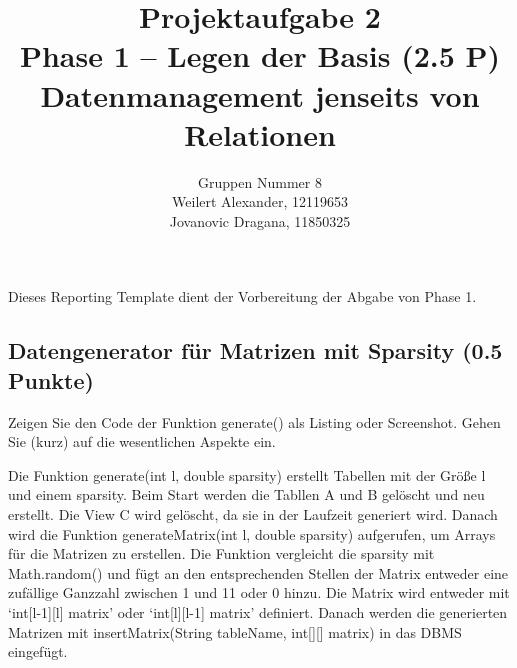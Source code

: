 \documentclass[11pt]{scrartcl}
\title{
  \textbf{\large Projektaufgabe 2 } \\
  Phase 1 – Legen der Basis (2.5 P) \\
  {\large Datenmanagement jenseits von Relationen}
}
\author{
  Gruppen Nummer 8 \\
  \large Weilert Alexander, 12119653 \\
  \large Jovanovic Dragana, 11850325
}
\begin{document}
\maketitle\thispagestyle{empty}

Dieses Reporting Template dient der Vorbereitung der Abgabe von Phase 1.

\subsection*{Datengenerator für Matrizen mit Sparsity (0.5 Punkte)}

Zeigen Sie den Code der Funktion generate() als Listing oder Screenshot.
Gehen Sie (kurz) auf die wesentlichen Aspekte ein.

Die Funktion generate(int l, double sparsity) erstellt Tabellen mit der Größe l und einem sparsity.
Beim Start werden die Tabllen A und B gelöscht und neu erstellt. 
Die View C wird gelöscht, da sie in der Laufzeit generiert wird.
Danach wird die Funktion generateMatrix(int l, double sparsity) aufgerufen, um Arrays für die Matrizen zu erstellen. 
Die Funktion vergleicht die sparsity mit Math.random() und fügt an den entsprechenden Stellen der Matrix entweder eine zufällige Ganzzahl zwischen 1 und 11 oder 0 hinzu.
Die Matrix wird entweder mit `int[l-1][l] matrix' oder `int[l][l-1] matrix' definiert.
Danach werden die generierten Matrizen mit insertMatrix(String tableName, int[][] matrix) in das DBMS eingefügt. 
\end{document}

